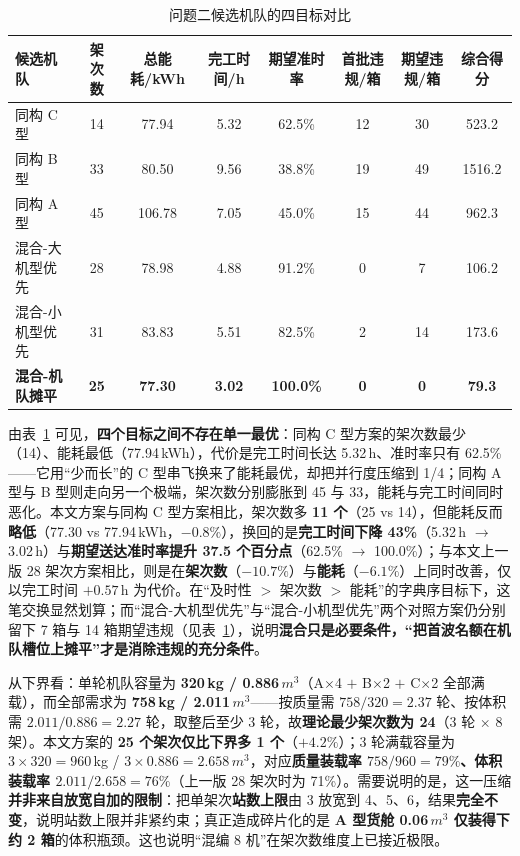 \begin{table}[htbp]
	\caption{问题二候选机队的四目标对比}
	\label{tab:q2_tradeoff}
	\centering
	\setlength{\tabcolsep}{4.5pt}
	\begin{tabular}{lccccccc}
		\toprule
		候选机队 & 架次数 & 总能耗/kWh & 完工时间/h & 期望准时率 & 首批违规/箱 & 期望违规/箱 & 综合得分 \\
		\midrule
		同构 C 型 & 14 & 77.94 & 5.32 & 62.5\% & 12 & 30 & 523.2 \\
		同构 B 型 & 33 & 80.50 & 9.56 & 38.8\% & 19 & 49 & 1516.2 \\
		同构 A 型 & 45 & 106.78 & 7.05 & 45.0\% & 15 & 44 & 962.3 \\
		混合-大机型优先 & 28 & 78.98 & 4.88 & 91.2\% & 0 & 7 & 106.2 \\
		混合-小机型优先 & 31 & 83.83 & 5.51 & 82.5\% & 2 & 14 & 173.6 \\
		\textbf{混合-机队摊平} & \textbf{25} & \textbf{77.30} & \textbf{3.02} & \textbf{100.0\%} & \textbf{0} & \textbf{0} & \textbf{79.3} \\
		\bottomrule
	\end{tabular}
\end{table}

由表~\ref{tab:q2_tradeoff} 可见，\textbf{四个目标之间不存在单一最优}：同构 C 型方案的架次数最少（14）、能耗最低（77.94\,kWh），代价是完工时间长达 5.32\,h、准时率只有 62.5\%——它用“少而长”的 C 型串飞换来了能耗最优，却把并行度压缩到 1/4；同构 A 型与 B 型则走向另一个极端，架次数分别膨胀到 45 与 33，能耗与完工时间同时恶化。本文方案与同构 C 型方案相比，架次数多 \textbf{11 个}（25 vs 14），但能耗反而\textbf{略低}（77.30 vs 77.94\,kWh，$-0.8\%$），换回的是\textbf{完工时间下降 43\%}（5.32\,h $\to$ 3.02\,h）与\textbf{期望送达准时率提升 37.5 个百分点}（62.5\% $\to$ 100.0\%）；与本文上一版 28 架次方案相比，则是在\textbf{架次数}（$-10.7\%$）与\textbf{能耗}（$-6.1\%$）上同时改善，仅以完工时间 $+0.57$\,h 为代价。在“及时性 $>$ 架次数 $>$ 能耗”的字典序目标下，这笔交换显然划算；而“混合-大机型优先”与“混合-小机型优先”两个对照方案仍分别留下 7 箱与 14 箱期望违规（见表~\ref{tab:q2_tradeoff}），说明\textbf{混合只是必要条件，“把首波名额在机队槽位上摊平”才是消除违规的充分条件}。

从下界看：单轮机队容量为 \textbf{320\,kg / 0.886\,$m^{3}$}（A$\times$4 $+$ B$\times$2 $+$ C$\times$2 全部满载），而全部需求为 \textbf{758\,kg / 2.011\,$m^{3}$}——按质量需 $758/320=2.37$ 轮、按体积需 $2.011/0.886=2.27$ 轮，取整后至少 3 轮，故\textbf{理论最少架次数为 24}（3 轮 $\times$ 8 架）。本文方案的 \textbf{25 个架次仅比下界多 1 个}（$+4.2\%$）；3 轮满载容量为 $3\times320=960$\,kg / $3\times0.886=2.658$\,$m^{3}$，对应\textbf{质量装载率 $758/960=79\%$、体积装载率 $2.011/2.658=76\%$}（上一版 28 架次时为 71\%）。需要说明的是，这一压缩\textbf{并非来自放宽自加的限制}：把单架次\textbf{站数上限}由 3 放宽到 4、5、6，结果\textbf{完全不变}，说明站数上限并非紧约束；真正造成碎片化的是 \textbf{A 型货舱 0.06\,$m^{3}$ 仅装得下约 2 箱}的体积瓶颈。这也说明“混编 8 机”在架次数维度上已接近极限。

